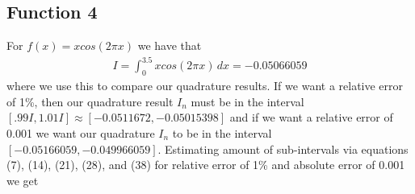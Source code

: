 \documentclass[12pt]{article}
\theoremstyle{remark}
\begin{document}
\newpage

\subsection{Function 4}

For $f(x) = xcos(2\pi x)$ we have that
\begin{align} 
I = \int_{0}^{3.5} xcos(2\pi x) \, dx = -0.05066059
\end{align}
where we use this to compare our quadrature results. If we want a relative error of 1\%, then our quadrature result $I_n$ must be in the interval $[.99I, 1.01I] \approx [-0.0511672, -0.05015398]$ and if we want a relative error of 0.001 we want our quadrature $I_n$ to be in the interval $[-0.05166059,-0.049966059]$. Estimating amount of sub-intervals via equations (7), (14), (21), (28), and (38) for relative error of 1\% and absolute error of 0.001 we get
\end{document}
